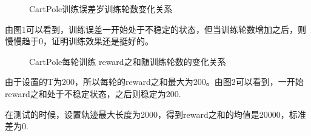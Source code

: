 \documentclass[a4paper,UTF8]{article}
\theoremstyle{definition}
\begin{document}
\begin{figure}[htb]
    \caption{\label{cartpole:1} CartPole训练误差岁训练轮数变化关系}
    \end{figure}

由图1可以看到，训练误差一开始处于不稳定的状态，但当训练轮数增加之后，则慢慢趋于0，证明训练效果还是挺好的。

\begin{figure}[htb]
    \caption{\label{cartpole:2} CartPole每轮训练 reward之和随训练轮数的变化关系}
    \end{figure}

由于设置的T为200，所以每轮的reward之和最大为200。由图2可以看到，一开始reward之和处于不稳定状态，之后则稳定为200.

在测试的时候，设置轨迹最大长度为2000，得到reward之和的均值是20000，标准差为0.
\end{document}
